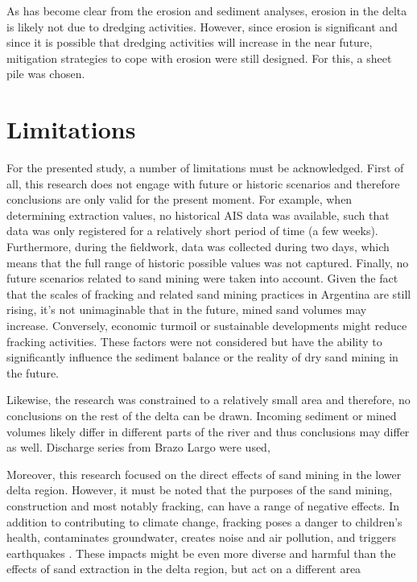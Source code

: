 As has become clear from the erosion and sediment analyses, erosion in the delta is likely not due to dredging activities. However, since erosion is significant and since it is possible that dredging activities will increase in the near future, mitigation strategies to cope with erosion were still designed. For this, a sheet pile was chosen.

\section{Limitations}
For the presented study, a number of limitations must be acknowledged. First of all, this research does not engage with future or historic scenarios and therefore conclusions are only valid for the present moment. For example, when determining extraction values, no historical AIS data was available, such that data was only registered for a relatively short period of time (a few weeks). Furthermore, during the fieldwork, data was collected during two days, which means that the full range of historic possible values was not captured. Finally, no future scenarios related to sand mining were taken into account. Given the fact that the scales of fracking and related sand mining practices in Argentina are still rising, it's not unimaginable that in the future, mined sand volumes may increase. Conversely, economic turmoil or sustainable developments might reduce fracking activities. These factors were not considered but have the ability to significantly influence the sediment balance or the reality of dry sand mining in the future.

Likewise, the research was constrained to a relatively small area and therefore, no conclusions on the rest of the delta can be drawn. Incoming sediment or mined volumes likely differ in different parts of the river and thus conclusions may differ as well. Discharge series from Brazo Largo were used, 

Moreover, this research focused on the direct effects of sand mining in the lower delta region. However, it must be noted that the purposes of the sand mining, construction and most notably fracking, can have a range of negative effects. In addition to contributing to climate change, fracking poses a danger to children's health, contaminates groundwater, creates noise and air pollution, and triggers earthquakes . These impacts might be even more diverse and harmful than the effects of sand extraction in the delta region, but act on a different area




